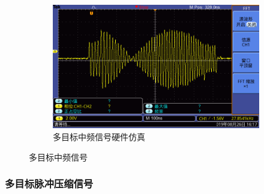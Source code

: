 \documentclass{article}
\newcounter{sub}
\begin{document}
\begin{figure}[H]
\begin{subfigure}[H]{.45\linewidth}
		\centering
		\includegraphics[width=\linewidth]{two-MF-hardware.png}
		\caption{多目标中频信号硬件仿真}
		\label{fig:多目标中频信号硬件仿真}
	\end{subfigure}
	\caption{多目标中频信号}
	\label{fig:多目标中频信号}
\end{figure}

\subsubsection{多目标脉冲压缩信号}%
\label{ssub:多目标脉冲压缩信号}
\end{document}
